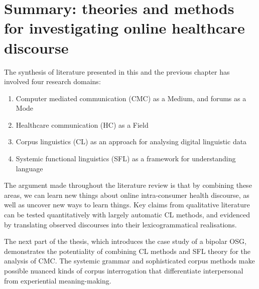 



%

\section[Chapter summary]{Summary: theories and methods for investigating online healthcare discourse}

The synthesis of literature presented in this and the previous chapter has involved four research domains:

\begin{enumerate}
	\item Computer mediated communication (CMC) as a Medium, and \glspl{forum} as a \gls{Mode}
	\item Healthcare communication (HC) as a Field
	\item Corpus linguistics (CL) as an approach for analysing digital linguistic data
	\item Systemic functional linguistics (SFL) as a framework for understanding language
\end{enumerate}
%
The argument made throughout the literature review is that by combining these areas, we can learn new things about online intra\hyp{}\gls{consumer} health discourse, as well as uncover new ways to learn things. Key claims from qualitative literature can be tested quantitatively with largely automatic \gls{CL} methods, and evidenced by translating observed discourses into their lexicogrammatical realisations. 

The next part of the thesis, which introduces the case study of a \gls{bipolar} \gls{OSG}, demonstrates the potentiality of combining \gls{CL} methods and \gls{SFL} theory for the analysis of \gls{CMC}. The systemic grammar and sophisticated corpus methods make possible nuanced kinds of corpus interrogation that differentiate interpersonal from experiential meaning\hyp{}making.





%
